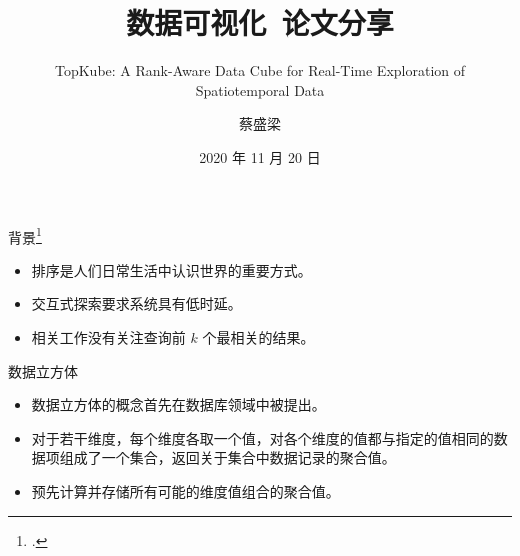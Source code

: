\documentclass[10pt,aspectratio=169]{beamer}
\title{数据可视化\, 论文分享}
\subtitle{TopKube: A Rank-Aware Data Cube for Real-Time Exploration of Spatiotemporal Data}
\author{蔡盛梁}
\institute{华东师范大学计算机科学与技术学院}
\date{2020 年 11 月 20 日}
\begin{document}
\begin{frame}
    \titlepage
\end{frame}

\begin{frame}{背景\footcite{Miranda2018}}
    \begin{itemize}[<+->]
        \item 排序是人们日常生活中认识世界的重要方式。
        \item 交互式探索要求系统具有低时延。
        \item 相关工作没有关注查询前 $k$ 个最相关的结果。
    \end{itemize}
\end{frame}

\begin{frame}{数据立方体}
    \begin{itemize}[<+->]
        \item 数据立方体的概念首先在数据库领域中被提出。
        \item 对于若干维度，每个维度各取一个值，对各个维度的值都与指定的值相同的数据项组成了一个集合，返回关于集合中数据记录的聚合值。
        \item 预先计算并存储所有可能的维度值组合的聚合值。
    \end{itemize}
\end{frame}
\end{document}

